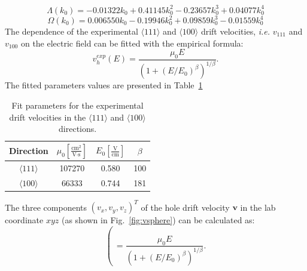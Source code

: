 \begin{equation}
  \label{eq:lamb}
   \Lambda(k_{0}) = -0.01322k_{0} + 0.41145k_{0}^{2} - 0.23657k_{0}^{3} + 0.04077k_{0}^{4}
\end{equation}
\begin{equation}
  \label{eq:ome}
   \Omega(k_{0}) = 0.006550k_{0} - 0.19946k_{0}^{2} + 0.09859k_{0}^{3} - 0.01559k_{0}^{4}
\end{equation}
The dependence of the experimental $\langle111\rangle$ and $\langle100\rangle$ drift velocities, \textit{i.e.} $v_{111}$ and $v_{100}$ on the electric field can be fitted with the empirical formula: 
\begin{equation}
  \label{eq:exph}  
  v_{h}^{exp}(E) = \frac{\mu_{0}E}{(1+(E/E_{0})^{\beta})^{1/\beta}}.
\end{equation}
The fitted parameters values are presented in Table~\ref{tab:parh}
\begin{table}[tbhp]
  \centering
  \begin{tabular}{cccc}\hline\hline
    Direction & $\mu_{0} \left[ \frac{\mbox{cm}^{2}}{\mbox{V}\cdot\mbox{s}} \right]$ & $E_{0} \left[ \frac{\mbox{V}}{\mbox{cm}} \right]$ & $\beta$ \\\hline
$\langle111\rangle$ & 107270 & 0.580 & 100 \\
$\langle100\rangle$ & 66333 & 0.744 & 181 \\ \hline\hline
  \end{tabular}
  \caption{Fit parameters for the experimental drift velocities in the 
$\langle111\rangle$ and $\langle100\rangle$ directions.}
\label{tab:parh}
\end{table}

The three components $(v_{x}, v_{y}, v_{z})^{T}$ of the hole drift velocity $\mathbf{v}$ in the lab coordinate $xyz$ (as shown in Fig.~\ref{fig:vsphere}) can be calculated as:
\begin{equation}
  \label{eq:exph}  
  \left( \ = \frac{\mu_{0}E}{(1+(E/E_{0})^{\beta})^{1/\beta}}.
\end{equation}

